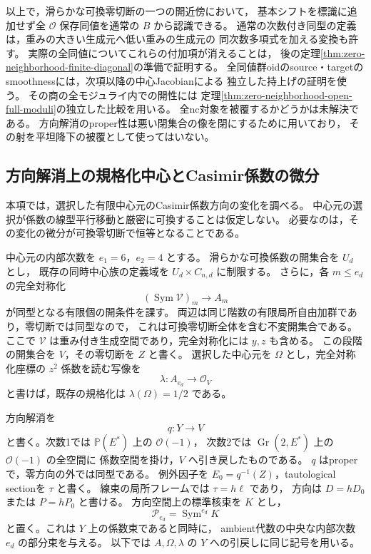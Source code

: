 \begin{remark}[結論の範囲]
以上で，滑らかな可換零切断の一つの開近傍において，
基本シフトを標識に追加せず全 $\mathcal O$ 保存同値を通常の $B$ から認識できる。
通常の次数付き同型の定義は，重みの大きい生成元へ低い重みの生成元の
同次数多項式を加える変換も許す。
実際の全同値についてこれらの付加項が消えることは，
後の定理\ref{thm:zero-neighborhood-finite-diagonal}の準備で証明する。
全同値群oidのsource・targetのsmoothnessには，次項以降の中心Jacobianによる
独立した持上げの証明を使う。
その商の全モジュライ内での開性には
定理\ref{thm:zero-neighborhood-open-full-moduli}の独立した比較を用いる。
全nc対象を被覆するかどうかは未解決である。
方向解消のproper性は悪い閉集合の像を閉にするために用いており，
その射を平坦降下の被覆として使ってはいない。
\end{remark}

\subsection{方向解消上の規格化中心とCasimir係数の微分}

本項では，選択した有限中心元のCasimir係数方向の変化を調べる。
中心元の選択が係数の線型平行移動と厳密に可換することは仮定しない。
必要なのは，その変化の微分が可換零切断で恒等となることである。

中心元の内部次数を $e_1=6$，$e_2=4$ とする。
滑らかな可換係数の開集合を $U_d$ とし，
既存の同時中心族の定義域を $U_d\times C_{n,d}$ に制限する。
さらに，各 $m\le e_d$ の完全対称化
\[
 (\operatorname{Sym}\mathcal V)_m\longrightarrow A_m
\]
が同型となる有限個の開条件を課す。
両辺は同じ階数の有限局所自由加群であり，零切断では同型なので，
これは可換零切断全体を含む不変開集合である。
ここで $\mathcal V$ は重み付き生成空間であり，完全対称化には $y,z$ も含める。
この段階の開集合を $V$，その零切断を $Z$ と書く。
選択した中心元を $\Omega$ とし，完全対称化座標の $z^2$ 係数を読む写像を
\[
       \lambda:A_{e_d}\longrightarrow\mathcal O_V
\]
と書けば，既存の規格化は $\lambda(\Omega)=1/2$ である。

方向解消を
\[
 q:Y\longrightarrow V
\]
と書く。次数1では $\mathbb P(E^*)$ 上の $\mathcal O(-1)$，
次数2では $\operatorname{Gr}(2,E^*)$ 上の $\mathcal O(-1)$ の全空間に
係数空間を掛け，$V$ へ引き戻したものである。
$q$ はproperで，零方向の外では同型である。
例外因子を $E_0=q^{-1}(Z)$，tautological sectionを $\tau$ と書く。
線束の局所フレームでは $\tau=h\ell$ であり，
方向は $D=hD_0$ または $P=hP_0$ と書ける。
方向空間上の標準核束を $K$ とし，
\[
            \mathcal P_{e_d}=\operatorname{Sym}^{e_d}K
\]
と置く。これは $Y$ 上の係数束であると同時に，
ambient代数の中央な内部次数 $e_d$ の部分束を与える。
以下では $A,\Omega,\lambda$ の $Y$ への引戻しに同じ記号を用いる。


